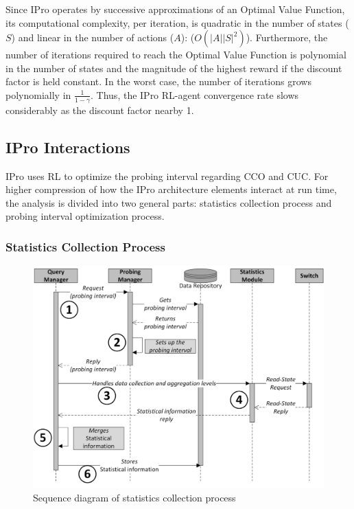Since IPro operates by successive approximations of an Optimal Value Function, its computational complexity, per iteration, is quadratic in the number of states ($S$) and linear in the number of actions ($A$): ($O\left ( \left | A \right |\left |  S\right |^{2} \right )$). Furthermore, the number of iterations required to reach the Optimal Value Function is polynomial in the number of states and the magnitude of the highest reward if the discount factor is held constant. In the worst case, the number of iterations grows polynomially in $\frac{1}{1-\gamma }$. Thus, the IPro RL-agent convergence rate slows considerably as the discount factor nearby 1.

\subsection{IPro Interactions}
\label{subsec:sequence-diagram}

IPro uses RL to optimize the probing interval regarding CCO and CUC. For higher compression of how the IPro architecture elements interact at run time, the analysis is divided into two general parts: statistics collection process and probing interval optimization process.

\subsubsection{Statistics Collection Process}
\label{subsec:statistics-collection-process}

\begin{figure}[h!]
    \centering
    \includegraphics[width=0.90\columnwidth]{figures/Figure5-IPro-Sequence-diagram-cp}
    \caption{Sequence diagram of statistics collection process}
    \label{fig:sequence-diagram-cp}
\end{figure}

